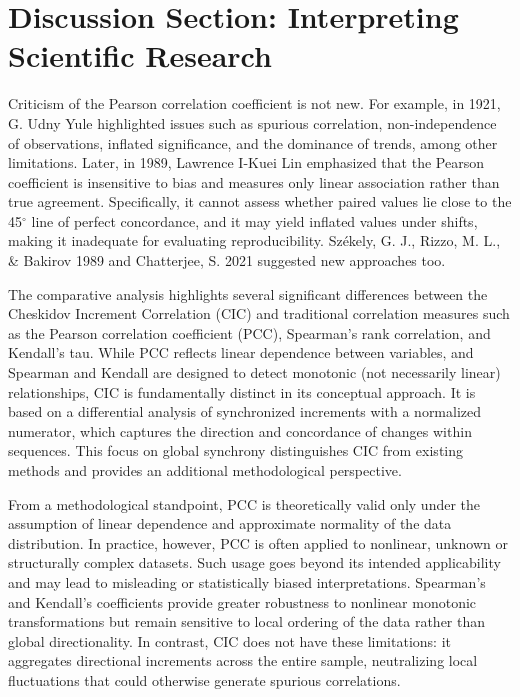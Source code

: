\documentclass[aos]{imsart}
\newcommand{\cic}{\text{CIC}}
\newcommand{\pcc}{\text{PCC}}
\begin{document}
\section{Discussion Section: Interpreting Scientific Research}

Criticism of the Pearson correlation coefficient is not new. For example, in 1921, G. Udny Yule \cite{r1} highlighted issues such as spurious correlation, non-independence of observations, inflated significance, and the dominance of trends, among other limitations. Later, in 1989, Lawrence I-Kuei Lin \cite{r2} emphasized that the Pearson coefficient is insensitive to bias and measures only linear association rather than true agreement. Specifically, it cannot assess whether paired values lie close to the 45$^\circ$ line of perfect concordance, and it may yield inflated values under shifts, making it inadequate for evaluating reproducibility. Sz\'ekely, G. J., Rizzo, M. L., \& Bakirov 1989 \cite{r4} and Chatterjee, S. 2021 \cite{r5} suggested new approaches too. 

The comparative analysis highlights several significant differences between the Cheskidov Increment Correlation ($\cic$) and traditional correlation measures such as the Pearson correlation coefficient ($\pcc$), Spearman’s rank correlation, and Kendall’s tau. While $\pcc$ reflects linear dependence between variables, and Spearman and Kendall are designed to detect monotonic (not necessarily linear) relationships, $\cic$ is fundamentally distinct in its conceptual approach. It is based on a differential analysis of synchronized increments with a normalized numerator, which captures the direction and concordance of changes within sequences. This focus on global synchrony distinguishes $\cic$ from existing methods and provides an additional methodological perspective.

From a methodological standpoint, $\pcc$ is theoretically valid only under the assumption of linear dependence and approximate normality of the data distribution. In practice, however, $\pcc$ is often applied to nonlinear, unknown or structurally complex datasets. Such usage goes beyond its intended applicability and may lead to misleading or statistically biased interpretations. Spearman’s and Kendall’s coefficients provide greater robustness to nonlinear monotonic transformations but remain sensitive to local ordering of the data rather than global directionality. In contrast, $\cic$ does not have these limitations: it aggregates directional increments across the entire sample, neutralizing local fluctuations that could otherwise generate spurious correlations.
\end{document}
